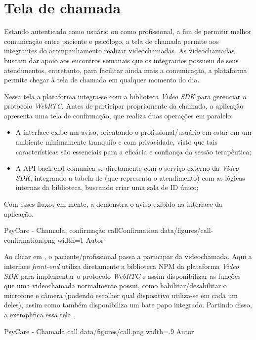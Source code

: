 \section{Tela de chamada}
\label{sec:chamada}

Estando autenticado como usuário ou como profissional, a fim de permitir melhor comunicação entre paciente e psicólogo, a tela de chamada permite aos integrantes do acompanhamento realizar videochamadas. As videochamadas buscam dar apoio aos encontros semanais que os integrantes possuem de seus atendimentos, entretanto, para facilitar ainda mais a comunicação, a plataforma permite chegar à tela de chamada em qualquer momento do dia. 

Nessa tela a plataforma integra-se com a biblioteca \textit{Video SDK} para gerenciar o protocolo \textit{WebRTC}. Antes de participar propriamente da chamada, a aplicação apresenta uma tela de confirmação, que realiza duas operações em paralelo:
\begin{itemize}
    \item A interface exibe um aviso, orientando o profissional/usuário em estar em um ambiente minimamente tranquilo e com privacidade, visto que tais características são essenciais para a eficácia e confiança da sessão terapêutica; 
    \item A API back-end comunica-se diretamente com o serviço externo da \textit{Video SDK}, integrando a tabela de  (que representa o atendimento) com as lógicas internas da biblioteca, buscando criar uma sala de ID único;
\end{itemize}
Com esses fluxos em mente, a  demonstra o aviso exibido na interface da aplicação.

\image
    {PsyCare - Chamada, confirmação}
    {callConfirmation}
    {data/figures/call-confirmation.png}
    {width=1\textwidth}
    {Autor}

Ao clicar em , o paciente/profissional passa a participar da videochamada. Aqui a interface \textit{front-end} utiliza diretamente a biblioteca NPM da plataforma \textit{Video SDK} para implementar o protocolo \textit{WebRTC} e assim disponibilizar as funções que uma videochamada normalmente possui, como habilitar/desabilitar o microfone e câmera (podendo escolher qual dispositivo utiliza-se em cada um deles), assim como também disponibiliza um bate papo integrado. Partindo disso, a  exemplifica essa tela.

\image
    {PsyCare - Chamada}
    {call}
    {data/figures/call.png}
    {width=.9\textwidth}
    {Autor}

